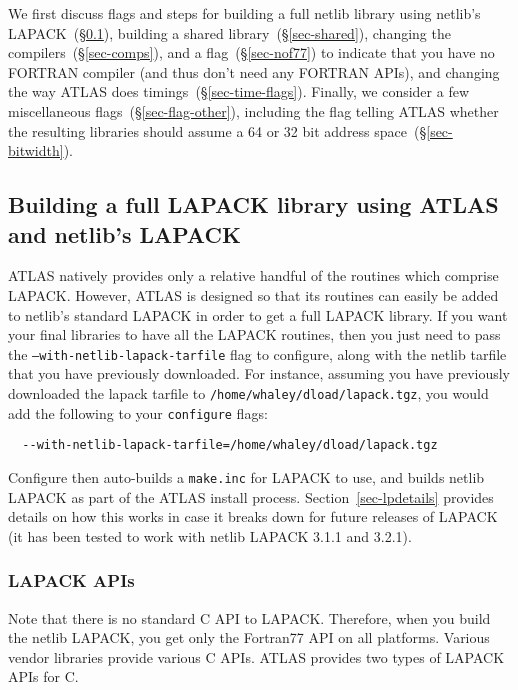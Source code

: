 \documentclass[11pt]{article}
\begin{document}
We first discuss flags and steps for building a full netlib library
using netlib's LAPACK~(\S\ref{sec-lapack}), 
building a shared library~(\S\ref{sec-shared}),
changing the compilers~(\S\ref{sec-comps}), and 
a flag~(\S\ref{sec-nof77}) to indicate that you have no FORTRAN compiler 
(and thus don't need any FORTRAN APIs), and changing the way ATLAS
does timings~(\S\ref{sec-time-flags}). 
Finally, we consider a few
miscellaneous flags~(\S\ref{sec-flag-other}), including the flag telling
ATLAS whether the resulting libraries should assume a 64 or 32 bit
address space~(\S\ref{sec-bitwidth}).

\subsection{Building a full LAPACK library using ATLAS and netlib's LAPACK}
\label{sec-lapack}
ATLAS natively provides only a relative handful of the routines which comprise
LAPACK.  However, ATLAS is designed so that its routines can easily be
added to netlib's standard LAPACK in order to get a full LAPACK library.
If you want your final libraries to have all the LAPACK routines,
then you just need to pass the {\tt --with-netlib-lapack-tarfile} flag
to configure, along with the netlib tarfile that you have previously
downloaded.  For instance, assuming you have previously downloaded
the lapack tarfile to {\tt /home/whaley/dload/lapack.tgz}, you
would add the following to your {\tt configure} flags:
\begin{verbatim}
  --with-netlib-lapack-tarfile=/home/whaley/dload/lapack.tgz
\end{verbatim}

Configure then auto-builds a {\tt make.inc} for LAPACK to use,
and builds netlib LAPACK as part of the ATLAS install process.
Section~\ref{sec-lpdetails} provides details on how this works 
in case it breaks down for future releases of LAPACK (it has been
tested to work with netlib LAPACK 3.1.1 and 3.2.1).

\subsubsection{LAPACK APIs}
Note that there is no standard C API to LAPACK.  Therefore, when
you build the netlib LAPACK, you get only the Fortran77 API on
all platforms.  Various vendor libraries provide various C APIs.
ATLAS provides two types of LAPACK APIs for C.
\end{document}
